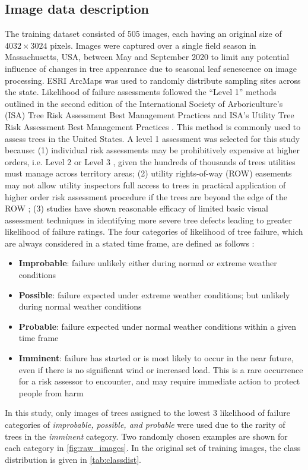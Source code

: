 \documentclass[Journal,letterpaper, SingleSpace, InsideFigs]{ascelike-new}
\begin{document}
\subsection{Image data description}
The training dataset consisted of 505 images, each having an original size of $4032\times3024$ pixels.   Images were captured over a single field season in Massachusetts, USA, between May and September 2020 to limit any potential influence of changes in tree appearance due to seasonal leaf senescence on image processing.  ESRI ArcMaps was used to randomly distribute sampling sites across the state.  Likelihood of failure assessments followed the “Level 1” methods outlined in the second edition of the International Society of Arboriculture’s (ISA) Tree Risk Assessment Best Management Practices \cite{smiley2017best} and ISA’s Utility Tree Risk Assessment Best Management Practices \cite{goodfellow2020best}.  This method is commonly used to assess trees in the United States.  A level 1 assessment was selected for this study because: (1) individual risk assessments may be prohibitively expensive at higher orders, i.e. Level 2 or Level 3 \cite{smiley2017best}, given the hundreds of thousands of trees utilities must manage across territory areas;  (2) utility rights-of-way (ROW) easements may not allow utility inspectors full access to trees in practical application of higher order risk assessment procedure if the trees are beyond the edge of the ROW \cite{goodfellow2020best}; (3) studies have shown reasonable efficacy of limited basic visual assessment techniques in identifying more severe tree defects \cite{rooney2005reliability,koeser2016frequency} leading to greater likelihood of failure ratings.  The four categories of likelihood of tree failure, which are always considered in a stated time frame, are defined as follows \cite{smiley2017best}:
\begin{itemize}
\item \textbf{Improbable}: failure unlikely either during normal or extreme weather conditions 
\item \textbf{Possible}: failure expected under extreme weather conditions; but unlikely during normal weather conditions
\item \textbf{Probable}: failure expected under normal weather conditions within a given time frame
\item \textbf{Imminent}: failure has started or is most likely to occur in the near future, even if there is no significant wind or increased load. This is a rare occurrence for a risk assessor to encounter, and may require immediate action to protect people from harm
\end{itemize}
In this study, only images of trees assigned to the lowest 3 likelihood of failure categories of \textit{improbable, possible, \textit{and} probable} were used due to the rarity of trees in the \textit{imminent} category. Two randomly chosen examples are shown for each category in \autoref{fig:raw_images}.   In the original set of training images, the class distribution is given in \autoref{tab:classdist}.
\end{document}

